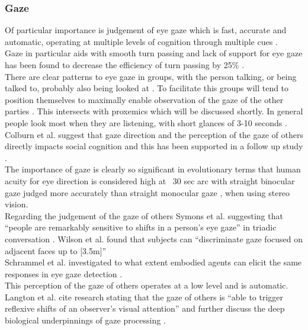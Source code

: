 \subsubsection{Gaze}
Of particular importance is judgement of eye gaze which is fast, accurate and automatic, operating at multiple levels of cognition through multiple cues \cite{Argyle,argyle1976gaze,Argyle1965,Argyle1976,Argyle1969, Kendon1967,Monk2002}.\\
Gaze in particular aids with smooth turn passing \cite{Hedge1978} \cite{Novick1996} and lack of support for eye gaze has been found to decrease the efficiency of turn passing by 25\% \cite{Vertegaal00effectsof}.\\
There are clear patterns to eye gaze in groups, with the person talking, or being talked to, probably also being looked at \cite{Vertegaal2001} \cite{Langton2000}. To facilitate this groups will tend to position themselves to maximally enable observation of the gaze of the other parties \cite{Kendon1967}. This intersects with proxemics which will be discussed shortly.  In general people look most when they are listening, with short glances of 3-10 seconds \cite{Argyle1965}. 
Colburn et al. suggest that gaze direction and the perception of the gaze of others directly impacts social cognition \cite{Colburn2000a} and this has been supported in a follow up study \cite{Macrae2002}.\\
The importance of gaze is clearly so significant in evolutionary terms that human acuity for eye direction is considered high at ~30 sec arc \cite{Symons2004} with straight binocular gaze judged more accurately than straight monocular gaze \cite{Kluttz2009}, when using stereo vision. \\
Regarding the judgement of the gaze of others Symons et al. suggesting that ``people are remarkably sensitive to shifts in a person's eye gaze'' in triadic conversation \cite{Symons2004}. Wilson et al. found that subjects can ``discriminate gaze focused on adjacent faces up to [3.5m]'' \cite{Wilson2000}\\
Schrammel et al. investigated to what extent embodied agents can elicit the same responses in eye gaze detection \cite{Schrammel2007}.\\
This perception of the gaze of others operates at a low level and is automatic. Langton et al. cite research stating that the gaze of others is ``able to trigger reflexive shifts of an observer's visual attention'' and further discuss the deep biological underpinnings of gaze processing \cite{doi:10.1080/713755908}. \\          
